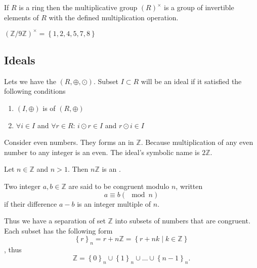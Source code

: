 \begin{appendices}
\begin{definition}
  If $R$ is a ring then the multiplicative group
  $\left(R\right)^\times$
  is a group of
  invertible elements of $R$ with the defined multiplication operation.
  \label{def:multiplicativegroup}
\end{definition}

\begin{example}
  $\left(\mathbb{Z}/9\mathbb{Z}\right)^\times =
  \left\{1,2,4,5,7,8\right\}$ \cite{wiki:multiplicativegroup}
  \label{ex:multiplicativegroup}
\end{example}

\subsection{Ideals}

\begin{definition}[Ideal]
  Lets we have the 
  $\left(R, \oplus, \odot\right)$. Subset $I \subset R$ will be an
  ideal if it satisfied the following conditions
  \begin{enumerate}
  \item $\left(I, \oplus\right)$ is  of
    $\left(R, \oplus\right)$
  \item $\forall i \in I$ and $\forall r \in R$:
    $i \odot r \in I$ and $r \odot i \in I$
  \end{enumerate}
  \label{def:ideal}
\end{definition}

\begin{example}
  Consider even numbers. They forms an  in
  $\mathbb{Z}$. Because multiplication of any even number to any
  integer is an even. The ideal's symbolic name is $2 \mathbb{Z}$.
  \label{ex:ideal}
\end{example}

\begin{example}
  Let $n \in \mathbb{Z}$ and $n > 1$. Then $n \mathbb{Z}$ is an
  .

  Two integer $a, b \in \mathbb{Z}$  are said to be congruent modulo
  $n$, written
  \[
  a \equiv b ( \mod n )
  \]
  if their difference $a - b$ is an integer multiple of $n$.

  Thus we have a separation of set $\mathbb{Z}$ into subsets of
  numbers that are congruent. Each subset has the following form
  \[
  \left\{r\right\}_n = r + n \mathbb{Z} =
  \left\{r + n k \mid k \in \mathbb{Z}\right\}
  \],
  thus
  \[
  \mathbb{Z} = \left\{0\right\}_n \cup \left\{1\right\}_n
  \cup \dots \cup \left\{n-1\right\}_n.
  \]


\end{example}
\end{appendices}
